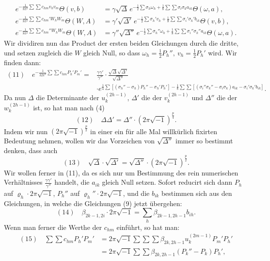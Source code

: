 \documentclass[10pt]{article}
\begin{document}
\[
\begin{aligned}
e^{-\frac{1}{8\pi^2}\sum\sum c_{hm}v_hv_m}\Theta(v,b)
&=\gamma\sqrt{\Delta}\,e^{-\frac12\sum\sigma_h\omega_h+\frac18\sum\sum\sigma_i\sigma_ka_{ik}}\Theta(\omega,a),\\
e^{-\frac{1}{8\pi^2}\sum\sum c_{hm}'W_hW_m}\Theta(W,A)
&=\gamma'\sqrt{\Delta'}\,e^{-\frac12\sum\sigma_h'v_h+\frac18\sum\sum\sigma_i'\sigma_k'b_{ik}}\Theta(v,b),\\
e^{-\frac{1}{8\pi^2}\sum\sum c_{hm}''W_hW_m}\Theta(W,A)
&=\gamma''\sqrt{\Delta''}\,e^{-\frac12\sum\sigma_h''\omega_h+\frac18\sum\sum\sigma_i''\sigma_k''a_{ik}}\Theta(\omega,a).
\end{aligned}
\]
Wir dividiren nun das Product der ersten beiden Gleichungen durch die dritte, und setzen zugleich die \(W\) gleich Null, so dass \(\omega_h=\frac12P_h'',\ v_h=\frac12P_h'\) wird. Wir finden dann:
\[
\begin{aligned}
(11)\quad
e^{-\frac{1}{32\pi^2}\sum\sum c_{hm}P_h'P_m'}
={}&\frac{\gamma\gamma'}{\gamma''}\cdot\frac{\sqrt\Delta\sqrt{\Delta'}}{\sqrt{\Delta''}}\\
&\cdot e^{\frac14\sum[(\sigma_h''-\sigma_h)P_h''-\sigma_h'P_h']
-\frac18\sum\sum[(\sigma_i''\sigma_k''-\sigma_i\sigma_k)a_{ik}-\sigma_i'\sigma_k'b_{ik}]}.
\end{aligned}
\]
Da nun \(\Delta\) die Determinante der \(u_k^{(2h-1)}\), \(\Delta'\) die der \(v_k^{(2h-1)}\) und \(\Delta''\) die der \(w_k^{(2h-1)}\) ist, so hat man nach (4)
\[
(12)\quad
\Delta\Delta'=\Delta''\cdot(2\pi\sqrt{-1})^{\frac p4}.
\]
Indem wir nun \((2\pi\sqrt{-1})^{\frac p2}\) in einer ein für alle Mal willkürlich fixirten Bedeutung nehmen, wollen wir das Vorzeichen von \(\sqrt{\Delta''}\) immer so bestimmt denken, dass auch
\[
(13)\quad
\sqrt\Delta\cdot\sqrt{\Delta'}=\sqrt{\Delta''}\cdot(2\pi\sqrt{-1})^{\frac p2}.
\]
Wir wollen ferner in (11), da es sich nur um Bestimmung des rein numerischen Verhältnisses \(\frac{\gamma\gamma'}{\gamma''}\) handelt, die \(a_{ik}\) gleich Null setzen. Sofort reducirt sich dann \(P_h\) auf \(\varrho_h\cdot2\pi\sqrt{-1}\), \(P_h''\) auf \(\varrho_h''\cdot2\pi\sqrt{-1}\), und die \(b_{ik}\) bestimmen sich aus den Gleichungen, in welche die Gleichungen (9) jetzt übergehen:
\[
(14)\quad
\beta_{2k-1,2i}\cdot2\pi\sqrt{-1}=\sum_h\beta_{2k-1,2h-1}b_{ih}.
\]
Wenn man ferner die Werthe der \(c_{hm}\) einführt, so hat man:
\[
\begin{aligned}
(15)\quad
\sum\sum c_{hm}P_h'P_m'
&=2\pi\sqrt{-1}\sum\sum\sum\beta_{2k,2h-1}u_k^{(2m-1)}P_m'P_h'\\
&=2\pi\sqrt{-1}\sum\sum\beta_{2k,2h-1}(P_k''-P_k)P_h',
\end{aligned}
\]
\end{document}
